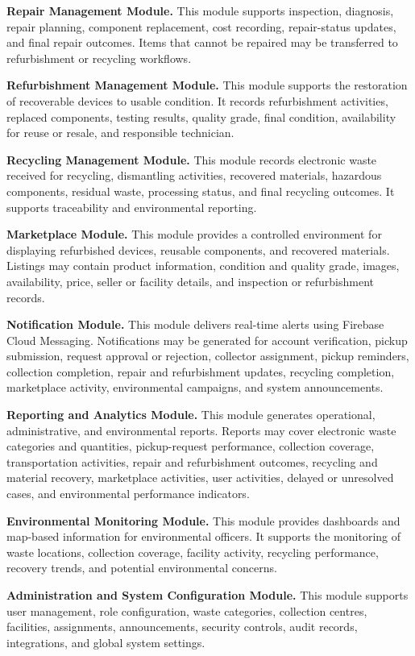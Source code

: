 \textbf{Repair Management Module.} This module supports inspection,
diagnosis, repair planning, component replacement, cost recording,
repair-status updates, and final repair outcomes. Items that cannot be repaired
may be transferred to refurbishment or recycling workflows.

\textbf{Refurbishment Management Module.} This module supports the
restoration of recoverable devices to usable condition. It records refurbishment
activities, replaced components, testing results, quality grade, final condition,
availability for reuse or resale, and responsible technician.

\textbf{Recycling Management Module.} This module records electronic waste
received for recycling, dismantling activities, recovered materials, hazardous
components, residual waste, processing status, and final recycling outcomes. It
supports traceability and environmental reporting.

\textbf{Marketplace Module.} This module provides a controlled environment
for displaying refurbished devices, reusable components, and recovered
materials. Listings may contain product information, condition and quality
grade, images, availability, price, seller or facility details, and inspection or
refurbishment records.

\textbf{Notification Module.} This module delivers real-time alerts using
Firebase Cloud Messaging. Notifications may be generated for account
verification, pickup submission, request approval or rejection, collector
assignment, pickup reminders, collection completion, repair and refurbishment
updates, recycling completion, marketplace activity, environmental campaigns,
and system announcements.

\textbf{Reporting and Analytics Module.} This module generates operational,
administrative, and environmental reports. Reports may cover electronic waste
categories and quantities, pickup-request performance, collection coverage,
transportation activities, repair and refurbishment outcomes, recycling and
material recovery, marketplace activities, user activities, delayed or unresolved
cases, and environmental performance indicators.

\textbf{Environmental Monitoring Module.} This module provides dashboards
and map-based information for environmental officers. It supports the
monitoring of waste locations, collection coverage, facility activity, recycling
performance, recovery trends, and potential environmental concerns.

\textbf{Administration and System Configuration Module.} This module
supports user management, role configuration, waste categories, collection
centres, facilities, assignments, announcements, security controls, audit records,
integrations, and global system settings.

